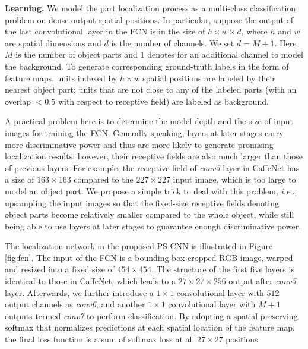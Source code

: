 \documentclass[10pt,twocolumn,letterpaper]{article}
\makeatletter
\DeclareRobustCommand\onedot{\futurelet\@let@token\@onedot}
\def\@onedot{\ifx\@let@token.\else.\null\fi\xspace}
\def\ie{\emph{i.e}\onedot} \def\Ie{\emph{I.e}\onedot}
\makeatother
\begin{document}
\noindent\textbf{Learning.} We model the part localization process as a multi-class classification problem on dense output spatial positions. In particular, suppose the output of the last convolutional layer in the FCN is in the size of $h\times w\times d$, where $h$ and $w$ are spatial dimensions and $d$ is the number of channels. We set $d=M+1$. Here $M$ is the number of object parts and $1$ denotes for an additional channel to model the background. To generate corresponding ground-truth labels in the form of feature maps, units indexed by $h \times w$ spatial positions are labeled by their nearest object part; units that are not close to any of the labeled parts (with an overlap $<0.5$ with respect to receptive field) are labeled as background.



A practical problem here is to determine the model depth and the size of input images for training the FCN. Generally speaking, layers at later stages carry more discriminative power and thus are more likely to generate promising localization results; however, their receptive fields are also much larger than those of previous layers. For example, the receptive field of \textit{conv5} layer in CaffeNet has a size of $163\times163$ compared to the $227\times227$ input image, which is too large to model an object part. We propose a simple trick to deal with this problem, \ie, upsampling the input images so that the fixed-size receptive fields denoting object parts become relatively smaller compared to the whole object, while still being able to use layers at later stages to guarantee enough discriminative power.







The localization network in the proposed PS-CNN is illustrated in Figure \ref{fig:fcn}. The input of the FCN is a bounding-box-cropped RGB image, warped and resized into a fixed size of $454\times454$. The structure of the first five layers is identical to those in CaffeNet, which leads to a $27\times27\times256$ output after \textit{conv5} layer. Afterwards, we further introduce a $1\times1$ convolutional layer with $512$ output channels as \textit{conv6}, and another $1\times1$ convolutional layer with $M+1$ outputs termed \textit{conv7} to perform classification. By adopting a spatial preserving softmax that normalizes predictions at each spatial location of the feature map, the final loss function is a sum of softmax loss at all $27\times27$ positions:
\end{document}
